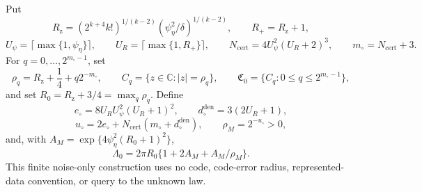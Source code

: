 Put
\[
 R_{\mathrm z}=(2^{k+4}k!)^{1/(k-2)}
 (\psi_\eta^2/\delta)^{1/(k-2)},\qquad R_+=R_{\mathrm z}+1,
\]
\[
 U_\psi=\lceil\max\{1,\psi_\eta\}\rceil,\qquad
 U_R=\lceil\max\{1,R_+\}\rceil,\qquad
 N_{\mathrm{cert}}=4U_\psi^2(U_R+2)^3,\qquad
 m_\circ=N_{\mathrm{cert}}+3.
\]
For \(q=0,\ldots,2^{m_\circ-1}\), set
\[
 \rho_q=R_{\mathrm z}+\frac14+q2^{-m_\circ},
 \qquad C_q=\{z\in\mathbb C:|z|=\rho_q\},
 \qquad \mathfrak C_0=\{C_q:0\le q\le2^{m_\circ-1}\},
\]
and set \(R_0=R_{\mathrm z}+3/4=\max_q\rho_q\).  Define
\[
 e_\circ=8U_RU_\psi^2(U_R+1)^2,\qquad
 d_\circ^{\mathrm{den}}=3(2U_R+1),
\]
\[
 u_\circ=2e_\circ+N_{\mathrm{cert}}(m_\circ+d_\circ^{\mathrm{den}}),
 \qquad \rho_M=2^{-u_\circ}>0,
\]
and, with \(A_M=\exp\{4\psi_\eta^2(R_0+1)^2\}\),
\[
 \Lambda_0=2\pi R_0\{1+2A_M+A_M/\rho_M\}.
\]
This finite noise-only construction uses no code, code-error radius, represented-data convention, or query to the unknown law.